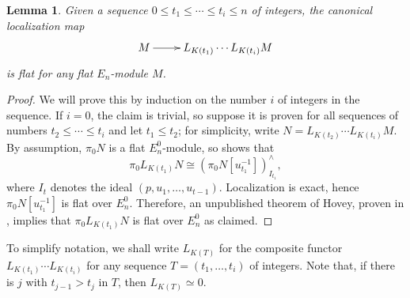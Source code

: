 \documentclass[oneside]{amsart}
\newtheorem{lem}[thm]{Lemma}
\theoremstyle{definition}
\theoremstyle{remark}
\theoremstyle{theorem}
\numberwithin{equation}{section}
\begin{document}
\begin{lem}\label{lem:flatlt}
Given a sequence $0 \le t_1 \le \cdots \le t_i \le n$ of integers, the canonical localization map 
\[
\xymatrix{M \ar[r] & L_{K(t_1)}\cdots L_{K(t_i)}M }
\]
is flat for any flat $E_n$-module $M$. 
\end{lem} 
\begin{proof}
We will prove this by induction on the number $i$ of integers in the sequence. If $i=0$, the claim is trivial, so suppose it is proven for all sequences of numbers $t_2 \le \cdots \le t_i$ and let $t_1 \le t_2$; for simplicity, write $N= L_{K(t_2)}\cdots L_{K(t_i)}M$. By assumption, $\pi_0N$ is a flat $E_n^0$-module, so \cite[Cor.~3.10]{bs_centralizers} shows that 
\[
\pi_0L_{K(t_1)}N \cong (\pi_0N[u_{t_1}^{-1}])_{I_{t_1}}^{\wedge},
\]
where $I_t$ denotes the ideal $(p,u_1,\ldots,u_{t-1})$. Localization is exact, hence $\pi_0N[u_{t_1}^{-1}]$ is flat over $E_n^0$. Therefore, an unpublished theorem of Hovey, proven in \cite[Prop.~A.15]{frankland}, implies that $\pi_0L_{K(t_1)}N$ is flat over $E_n^0$ as claimed. 
\end{proof}

To simplify notation, we shall write $L_{K(T)}$ for the composite functor $L_{K(t_1)}\cdots L_{K(t_i)}$ for any sequence $T = (t_1,\ldots,t_i)$ of integers. Note that, if there is $j$ with $t_{j-1}>t_{j}$ in $T$, then $L_{K(T)} \simeq 0$.
\end{document}
